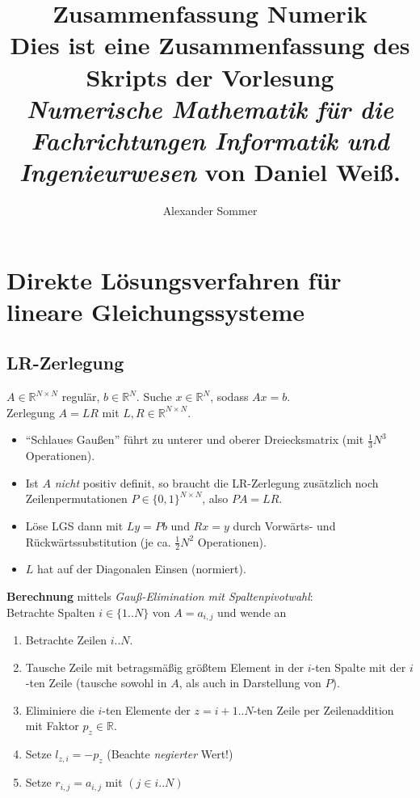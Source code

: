 \documentclass[a4paper]{article}
\title{
    \textbf{Zusammenfassung Numerik}
    \\
    \large
    Dies ist eine Zusammenfassung des Skripts der Vorlesung
    \\
    \emph{Numerische Mathematik für die Fachrichtungen Informatik und
    Ingenieurwesen} von Daniel Weiß.
}
\author{Alexander Sommer}
\newcommand{\set}[1]{\{ #1 \}}
\begin{document}
\maketitle

\tableofcontents

\newpage

\section{Direkte Lösungsverfahren für lineare Gleichungssysteme}

\subsection{LR-Zerlegung}

$ A \in \mathbb{R}^{N \times N} $ regulär, $b \in \mathbb{R}^N$.
Suche $ x \in \mathbb{R}^{N} $, sodass $Ax=b$.
\\
Zerlegung $A = LR$ mit $L, R \in \mathbb{R}^{N \times N}$.

\begin{itemize}
    \item \enquote{Schlaues Gaußen} führt zu unterer und oberer Dreiecksmatrix
    (mit $\frac{1}{3}N^3$ Operationen).
    \item Ist $A$ \emph{nicht} positiv definit, so braucht die LR-Zerlegung
    zusätzlich noch Zeilenpermutationen $P \in \set{0, 1}^{N \times N} $, 
    also $PA = LR$.
    \item Löse LGS dann mit $Ly = Pb$ und $Rx = y$ durch Vorwärts- und
    Rückwärtssubstitution (je ca. $\frac{1}{2}N^2$ Operationen).
    \item $L$ hat auf der Diagonalen Einsen (normiert).
\end{itemize}

\textbf{Berechnung} mittels \emph{Gauß-Elimination mit Spaltenpivotwahl}:
\\
Betrachte Spalten $i \in \set{1..N}$ von $A = a_{i, j}$ und wende an
\begin{enumerate}
    \item Betrachte Zeilen $i..N$.
    \item Tausche Zeile mit betragsmäßig größtem Element in der $i$-ten Spalte
    mit der $i$-ten Zeile (tausche sowohl in $A$, als auch in Darstellung von
    $P$).
    \item Eliminiere die $i$-ten Elemente der $z = i+1..N$-ten Zeile per
    Zeilenaddition mit Faktor $p_z \in \mathbb{R}$.
    \item Setze $l_{z, i} = -p_z$ (Beachte \emph{negierter} Wert!)
    \item Setze $r_{i, j} = a_{i, j}$ mit $(j \in {i..N})$
\end{enumerate}
\end{document}
